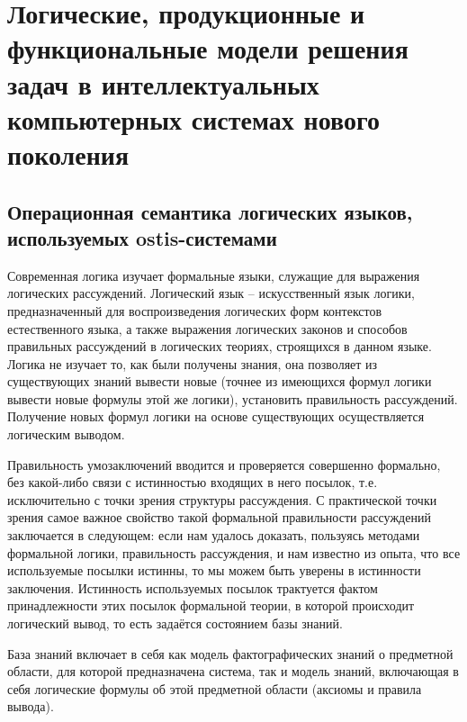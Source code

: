 \chapter{Логические, продукционные и функциональные модели решения задач в интеллектуальных компьютерных системах нового поколения}
\label{chapter_logic_productions}


\section{Операционная семантика логических языков, используемых ostis-системами}



Современная логика изучает формальные языки, служащие для выражения логических рассуждений.
Логический язык -- искусственный язык логики, предназначенный для воспроизведения логических форм контекстов естественного языка, а также выражения логических законов и способов правильных рассуждений в логических теориях, строящихся в данном языке. Логика не изучает то, как были получены знания, она позволяет из существующих знаний вывести новые (точнее из имеющихся формул логики вывести новые формулы этой же логики), установить правильность рассуждений. Получение новых формул логики на основе существующих осуществляется логическим выводом.

Правильность умозаключений вводится и проверяется совершенно формально, без какой-либо связи с истинностью входящих в него посылок, т.е. исключительно с точки зрения структуры рассуждения. С практической точки зрения самое важное свойство такой формальной правильности рассуждений заключается в следующем: если нам удалось доказать, пользуясь методами формальной логики, правильность рассуждения, и нам известно из опыта, что все используемые посылки истинны, то мы можем быть уверены в истинности заключения. Истинность используемых посылок трактуется фактом принадлежности этих посылок формальной теории, в которой происходит логический вывод, то есть задаётся состоянием базы знаний.

База знаний включает в себя как модель фактографических знаний о предметной области, для которой предназначена система, так и модель знаний, включающая в себя логические формулы об этой предметной области (аксиомы и правила вывода).

